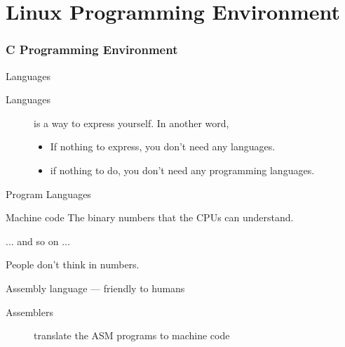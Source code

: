 \mode*
\part{Linux Programming Environment}

\section{C Programming Environment}
\label{sec:c-programming-basics}

\begin{frame}{Languages}
  \begin{description}
  \item[Languages] is a way to express yourself. In another word,
    \begin{itemize}
    \item If nothing to express, you don't need any languages.
    \item if nothing to do, you don't need any programming languages.
    \end{itemize}
  \end{description}
\end{frame}

\begin{frame}{Program Languages}
  \begin{block}{Machine code}
    The \alert{binary numbers} that the CPUs can understand.
    \begin{center}{ ... and so on ...}
    \end{center}
    People don't think in numbers.
  \end{block}
  \begin{block}{Assembly language --- friendly to humans}
    \begin{center}
    \end{center}
    \begin{description}
    \item[Assemblers] translate the ASM programs to machine code
    \end{description}
  \end{block}
\end{frame}

